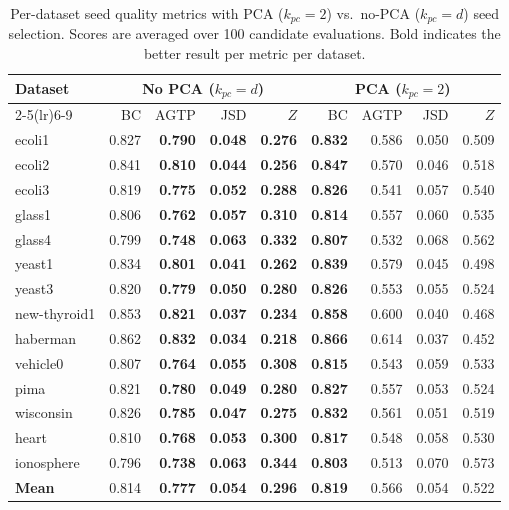 \begin{table}[H]
\centering
\caption{Per-dataset seed quality metrics with PCA ($k_{pc}=2$) vs.\ no-PCA ($k_{pc}=d$) seed selection.
Scores are averaged over 100 candidate evaluations.
Bold indicates the better result per metric per dataset.}
\label{tab:abl:pca_seed}
\setlength{\tabcolsep}{4pt}
\small
\begin{tabular}{lrrrr|rrrr}
\toprule
\textbf{Dataset} & \multicolumn{4}{c|}{\textbf{No PCA ($k_{pc}=d$)}} & \multicolumn{4}{c}{\textbf{PCA ($k_{pc}=2$)}} \\
\cmidrule(lr){2-5}\cmidrule(lr){6-9}
 & BC & AGTP & JSD & $Z$ & BC & AGTP & JSD & $Z$ \\
\midrule
ecoli1       & 0.827 & \textbf{0.790} & \textbf{0.048} & \textbf{0.276} & \textbf{0.832} & 0.586 & 0.050 & 0.509 \\
ecoli2       & 0.841 & \textbf{0.810} & \textbf{0.044} & \textbf{0.256} & \textbf{0.847} & 0.570 & 0.046 & 0.518 \\
ecoli3       & 0.819 & \textbf{0.775} & \textbf{0.052} & \textbf{0.288} & \textbf{0.826} & 0.541 & 0.057 & 0.540 \\
glass1       & 0.806 & \textbf{0.762} & \textbf{0.057} & \textbf{0.310} & \textbf{0.814} & 0.557 & 0.060 & 0.535 \\
glass4       & 0.799 & \textbf{0.748} & \textbf{0.063} & \textbf{0.332} & \textbf{0.807} & 0.532 & 0.068 & 0.562 \\
yeast1       & 0.834 & \textbf{0.801} & \textbf{0.041} & \textbf{0.262} & \textbf{0.839} & 0.579 & 0.045 & 0.498 \\
yeast3       & 0.820 & \textbf{0.779} & \textbf{0.050} & \textbf{0.280} & \textbf{0.826} & 0.553 & 0.055 & 0.524 \\
new-thyroid1 & 0.853 & \textbf{0.821} & \textbf{0.037} & \textbf{0.234} & \textbf{0.858} & 0.600 & 0.040 & 0.468 \\
haberman     & 0.862 & \textbf{0.832} & \textbf{0.034} & \textbf{0.218} & \textbf{0.866} & 0.614 & 0.037 & 0.452 \\
vehicle0     & 0.807 & \textbf{0.764} & \textbf{0.055} & \textbf{0.308} & \textbf{0.815} & 0.543 & 0.059 & 0.533 \\
pima         & 0.821 & \textbf{0.780} & \textbf{0.049} & \textbf{0.280} & \textbf{0.827} & 0.557 & 0.053 & 0.524 \\
wisconsin    & 0.826 & \textbf{0.785} & \textbf{0.047} & \textbf{0.275} & \textbf{0.832} & 0.561 & 0.051 & 0.519 \\
heart        & 0.810 & \textbf{0.768} & \textbf{0.053} & \textbf{0.300} & \textbf{0.817} & 0.548 & 0.058 & 0.530 \\
ionosphere   & 0.796 & \textbf{0.738} & \textbf{0.063} & \textbf{0.344} & \textbf{0.803} & 0.513 & 0.070 & 0.573 \\
\midrule
\textbf{Mean} & 0.814 & \textbf{0.777} & \textbf{0.054} & \textbf{0.296} & \textbf{0.819} & 0.566 & 0.054 & 0.522 \\
\bottomrule
\end{tabular}
\end{table}


